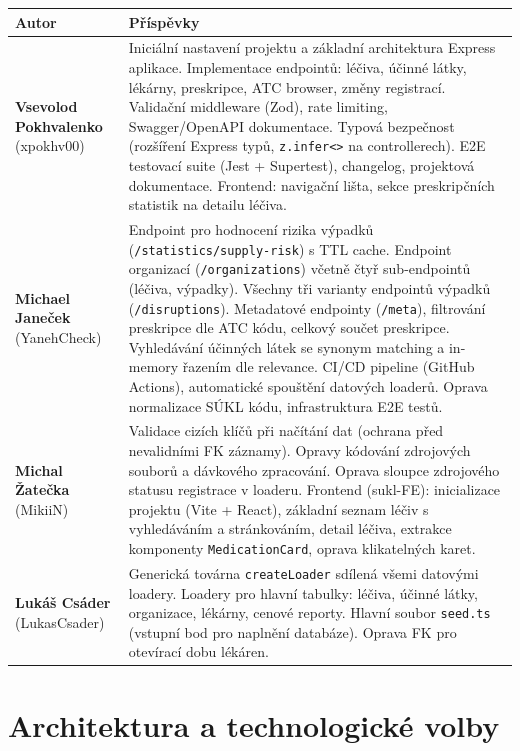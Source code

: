 \documentclass[12pt,a4paper]{article}
\begin{document}
\begin{longtable}{@{}p{4cm}p{10cm}@{}}
\toprule
\textbf{Autor} & \textbf{Příspěvky} \\
\midrule
\endhead
\textbf{Vsevolod Pokhvalenko} \newline (xpokhv00) &
Iniciální nastavení projektu a základní architektura Express aplikace.
Implementace endpointů: léčiva, účinné látky, lékárny, preskripce, ATC browser, změny registrací.
Validační middleware (Zod), rate limiting, Swagger/OpenAPI dokumentace.
Typová bezpečnost (rozšíření Express typů, \texttt{z.infer<>} na controllerech).
E2E testovací suite (Jest + Supertest), changelog, projektová dokumentace.
Frontend: navigační lišta, sekce preskripčních statistik na detailu léčiva.
\\[0.5em]
\textbf{Michael Janeček} \newline (YanehCheck) &
Endpoint pro hodnocení rizika výpadků (\texttt{/statistics/supply-risk}) s TTL cache.
Endpoint organizací (\texttt{/organizations}) včetně čtyř sub-endpointů (léčiva, výpadky).
Všechny tři varianty endpointů výpadků (\texttt{/disruptions}).
Metadatové endpointy (\texttt{/meta}), filtrování preskripce dle ATC kódu, celkový součet preskripce.
Vyhledávání účinných látek se synonym matching a in-memory řazením dle relevance.
CI/CD pipeline (GitHub Actions), automatické spouštění datových loaderů.
Oprava normalizace SÚKL kódu, infrastruktura E2E testů.
\\[0.5em]
\textbf{Michal Žatečka} \newline (MikiiN) &
Validace cizích klíčů při načítání dat (ochrana před nevalidními FK záznamy).
Opravy kódování zdrojových souborů a dávkového zpracování.
Oprava sloupce zdrojového statusu registrace v loaderu.
Frontend (sukl-FE): inicializace projektu (Vite + React), základní seznam léčiv s vyhledáváním a stránkováním, detail léčiva, extrakce komponenty \texttt{MedicationCard}, oprava klikatelných karet.
\\[0.5em]
\textbf{Lukáš Csáder} \newline (LukasCsader) &
Generická továrna \texttt{createLoader} sdílená všemi datovými loadery.
Loadery pro hlavní tabulky: léčiva, účinné látky, organizace, lékárny, cenové reporty.
Hlavní soubor \texttt{seed.ts} (vstupní bod pro naplnění databáze).
Oprava FK pro otevírací dobu lékáren.
\\
\bottomrule
\end{longtable}

\section{Architektura a technologické volby}
\end{document}
